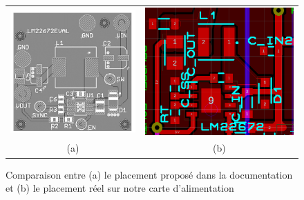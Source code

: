 				\begin{figure}
					\begin{center}
						\begin{tabular}{c c}
							\includegraphics[scale=0.40]{../Illus/plct_lm_data.png}	&
							\includegraphics[scale=0.40]{../Illus/plct_lm_reel.png}	\\
							(a) & (b) \\
						\end{tabular}
					\end{center}
					\caption{Comparaison entre (a) le placement proposé dans la documentation
							et (b) le placement réel sur notre carte d'alimentation}
					\label{placement_lm}
				\end{figure}
				
